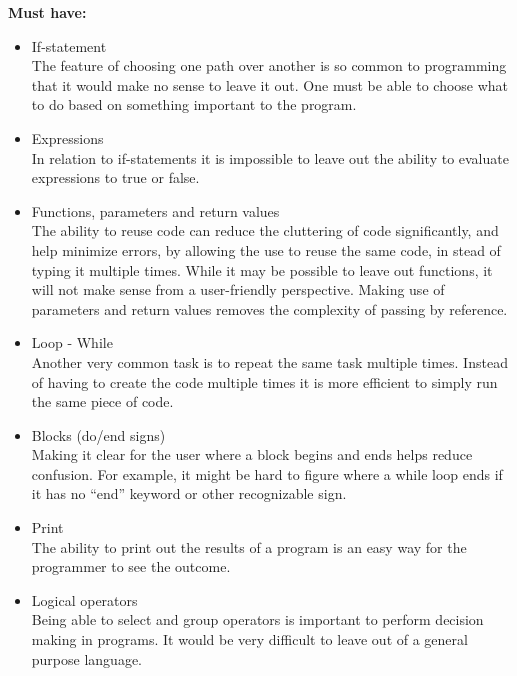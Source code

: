 \textbf{Must have:}
\begin{itemize}
\item If-statement \\
The feature of choosing one path over another is so common to programming that it would make no sense to leave it out. One must be able to choose what to do based on something important to the program. \\

\item Expressions \\
In relation to if-statements it is impossible to leave out the ability to evaluate expressions to true or false. \\

\item Functions, parameters and return values \\
The ability to reuse code can reduce the cluttering of code significantly, and help minimize errors, by allowing the use to reuse the same code, in stead of typing it
multiple times. While it may be possible to leave out functions, it will not make sense from a user-friendly perspective. Making use of parameters and return values removes the complexity of passing by reference. \\

\item Loop - While \\
Another very common task is to repeat the same task multiple times. Instead of having to create the code multiple times it is more efficient to simply run the same piece of code. \\

\item Blocks (do/end signs) \\
Making it clear for the user where a block begins and ends helps reduce confusion. For example, it might be hard to figure where a while loop ends if it has no ``end'' keyword or other recognizable sign. \\

\item Print \\
The ability to print out the results of a program is an easy way for the programmer to see the outcome. \\

\item Logical operators \\
Being able to select and group operators is important to perform decision making in programs. It would be very difficult to leave out of a general purpose language.\\


\end{itemize}
